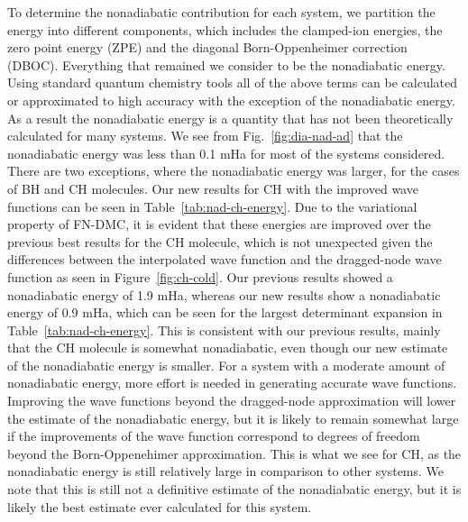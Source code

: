 To determine the nonadiabatic contribution for each system,
we partition the energy into different components,
which includes the clamped-ion energies, the zero point energy (ZPE) and the
diagonal Born-Oppenheimer correction (DBOC). Everything that remained we
consider to be the nonadiabatic energy. Using standard quantum chemistry tools
all of the above terms can be calculated or approximated to high accuracy with
the exception of the nonadiabatic energy. As a result the nonadiabatic energy is
a quantity that has not been theoretically calculated for many systems. We see from Fig.~\ref{fig:dia-nad-ad} that the nonadiabatic energy was less than 0.1 mHa for most of the
systems considered. There are two exceptions, where the nonadiabatic energy
was larger, for the cases of BH and CH molecules.
Our new results for CH with the improved wave functions can be seen in Table~\ref{tab:nad-ch-energy}. Due to the variational property of FN-DMC, it is evident that these energies
are improved over the previous best results for the CH molecule, which is not
unexpected given the differences between the interpolated wave function and the
dragged-node wave function as seen in Figure~\ref{fig:ch-cold}. Our previous results showed a
nonadiabatic energy of 1.9 mHa, whereas our new results show a nonadiabatic energy of
0.9 mHa, which can be seen for the largest determinant expansion in Table~\ref{tab:nad-ch-energy}. This
is consistent with our previous results, mainly that the CH molecule is somewhat
nonadiabatic, even though our new estimate of the nonadiabatic energy is smaller.
For a system with a moderate amount of nonadiabatic energy, more effort is needed
in generating accurate wave functions. Improving the wave functions beyond the
dragged-node approximation will lower the estimate of the nonadiabatic energy,
but it is likely to remain somewhat large if the improvements of the wave function
correspond to degrees of freedom beyond the Born-Oppenehimer approximation.
This is what we see for CH, as the nonadiabatic energy is still relatively large in
comparison to other systems. We note that this is still not a definitive estimate of
the nonadiabatic energy, but it is likely the best estimate ever calculated for this
system.


